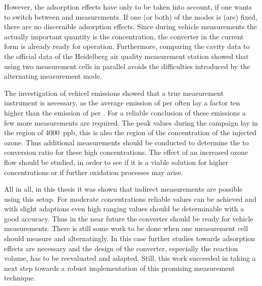 However, the adsorption effects have only to be taken into account, if
one wants to switch between  and  measurements. If
one (or both) of the modes is (are) fixed, there are no discernible
adsorption effects. Since during vehicle measurements the actually
important quantity is the  concentration, the converter in
the current form is already ready for operation. Furthermore,
comparing the cavity data to the official data of the Heidelberg air
quality measurement station showed that using two measurement cells in
parallel avoids the difficulties introduced by the alternating
measurement mode.

The investigation of vehicel emissions showed that a true 
measurement instrument is necessary, as the average emission of
 per  often lay a factor ten higher than the emission
of  per . For a reliable conclusion of these emissions
a few more measurements are required. The peak  values
during the campaign lay in the region of \SI{4000}{ppb}, this is also
the region of the concentration of the injected ozone. Thus additional
measurements should be conducted to determine the  to 
conversion ratio for these high concentrations. The effect of an
increased ozone flow should be studied, in order to see if it is a viable
solution for higher concentrations or if further oxidation processes
may arise.

All in all, in this thesis it was shown that indirect 
measurements are possible using this setup. For moderate
concentrations reliable  values can be achieved and with
slight adaptions even high ranging  values should be
determinable with a good accuracy. Thus in the near future the
converter should be ready for  vehicle measurements. There is
still some work to be done when one measurement cell should measure
 and  alternatingly. In this case further studies
towards adsorption effects are necessary and the design of the
converter, especially the reaction volume, has to be reevaluated and
adapted. Still, this work succeeded in taking a next step towards a
robust implementation of this promising measurement technique.

